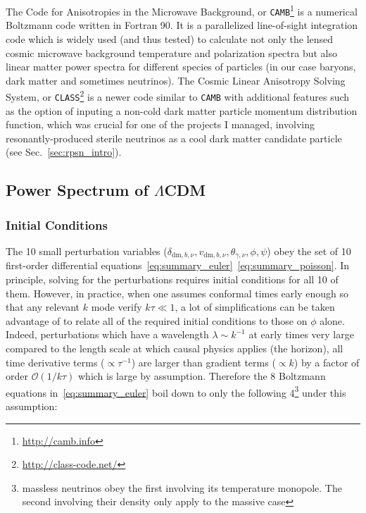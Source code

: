 \vspace*{1pc}


The Code for Anisotropies in the Microwave Background, or \texttt{CAMB}\footnote{\url{http://camb.info}} \citep{Lewis2000} is a
numerical Boltzmann code written in Fortran 90. It is a parallelized line-of-sight integration code which is widely used (and thus tested) to calculate not only
the lensed cosmic microwave background temperature and polarization spectra but also linear matter power spectra for different
species of particles (in our case baryons, dark matter and sometimes neutrinos). The Cosmic Linear Anisotropy Solving System, or \texttt{CLASS}\footnote{\url{http://class-code.net/}} \citep{CLASS} is a newer code  similar to \texttt{CAMB} with additional features such as the option of inputing a non-cold dark matter particle momentum distribution function, which was crucial for one of the projects I managed, involving resonantly-produced sterile neutrinos as a cool dark matter candidate particle (see Sec.~\ref{sec:rpsn_intro}).



\subsection{Power Spectrum of $\Lambda$CDM}

\subsubsection{Initial Conditions}
\label{sec:primordialps}

The 10 small perturbation variables ($\delta_{\mathrm{dm}, b, \nu}, v_{\mathrm{dm}, b, \nu}, \theta_{\gamma, \nu}, \phi, \psi$) obey the set of 10 first-order differential equations~\ref{eq:summary_euler}~\ref{eq:summary_poisson}. In principle, solving for the perturbations requires initial conditions for all 10 of them. However, in practice, when one assumes conformal times early enough so that any relevant $k$ mode verify $k \tau \ll 1$, a lot of simplifications can be taken advantage of to relate all of the required initial conditions to those on $\phi$ alone. Indeed, perturbations which have a wavelength $\lambda \sim k^{-1}$ at early times very large compared to the length scale at which causal physics applies (the horizon), all time derivative terms ($\propto \tau^{-1}$) are larger than gradient terms ($\propto k$) by a factor of order $\mathcal{O}(1/k\tau)$ which is large by assumption. Therefore the 8 Boltzmann equations in~\ref{eq:summary_euler} boil down to only the following 4\footnote{massless neutrinos obey the first involving its temperature monopole. The second involving their density only apply to the massive case} under this assumption:

